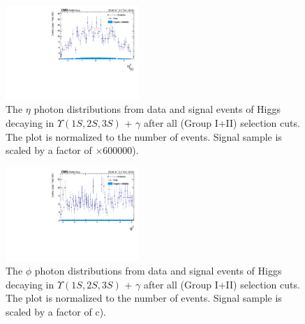 \begin{figure}[!htbp]
\begin{center}
\includegraphics[width=0.45\textwidth]{figures/outputPlots/HtoUpsilon_Cat0_ZZZZZ/nEvts/data_x_mc/withKinCuts/h_withKin_Photon_eta}\hspace*{1.cm}
\end{center}\vspace*{-.5cm}
\caption{The $\eta$ photon distributions from data and signal events of Higgs decaying in $\Upsilon(1S,2S,3S)$ + $\gamma$ after all (Group I+II) selection cuts. The plot is normalized to the number of events. Signal sample is scaled by a factor of $\times 600000$).}
\label{fig:etaPhoton_HtoUpsilon_Cat0_groupI_plus_II}
\end{figure}

\begin{figure}[!htbp]
\begin{center}
\includegraphics[width=0.45\textwidth]{figures/outputPlots/HtoUpsilon_Cat0_ZZZZZ/nEvts/data_x_mc/withKinCuts/h_withKin_Photon_phi}\hspace*{1.cm}
\end{center}\vspace*{-.5cm}
\caption{The $\phi$ photon distributions from data and signal events of Higgs decaying in $\Upsilon(1S,2S,3S)$ + $\gamma$ after all (Group I+II) selection cuts. The plot is normalized to the number of events. Signal sample is scaled by a factor of c).}
\label{fig:phiPhoton_HtoUpsilon_Cat0_groupI_plus_II}
\end{figure}

